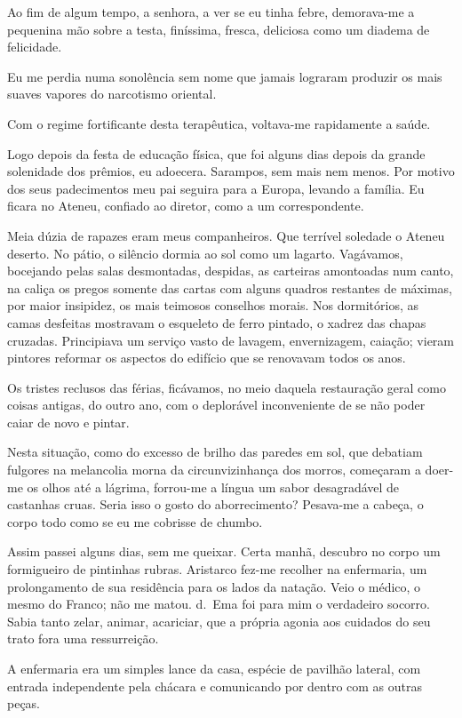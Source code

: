 Ao fim de algum tempo, a senhora, a ver se eu tinha febre, demorava{}-me
a pequenina mão sobre a testa, finíssima, fresca, deliciosa como um
diadema de felicidade. 

Eu me perdia numa sonolência sem nome que jamais
lograram produzir os mais suaves vapores do narcotismo oriental. 

Com o regime fortificante desta terapêutica, voltava{}-me rapidamente a
saúde. 

Logo depois da festa de educação física, que foi alguns dias
depois da grande solenidade dos prêmios, eu adoecera. Sarampos, sem
mais nem menos. Por motivo dos seus padecimentos meu pai seguira para a
Europa, levando a família. Eu ficara no Ateneu, confiado ao diretor,
como a um correspondente. 

Meia dúzia de rapazes eram meus companheiros.
Que terrível soledade o Ateneu deserto. No pátio, o silêncio dormia ao
sol como um lagarto. Vagávamos, bocejando pelas salas desmontadas,
despidas, as carteiras amontoadas num canto, na caliça os pregos
somente das cartas com alguns quadros restantes de máximas, por maior
insipidez, os mais teimosos conselhos morais. Nos dormitórios, as camas
desfeitas mostravam o esqueleto de ferro pintado, o xadrez das chapas
cruzadas. Principiava um serviço vasto de lavagem, envernizagem,
caiação; vieram pintores reformar os aspectos do edifício que se
renovavam todos os anos. 

Os tristes reclusos das férias, ficávamos, no
meio daquela restauração geral como coisas antigas, do outro ano, com o
deplorável inconveniente de se não poder caiar de novo e pintar. 

Nesta situação, como do excesso de brilho das paredes em sol, que debatiam
fulgores na melancolia morna da circunvizinhança dos morros, começaram
a doer{}-me os olhos até a lágrima, forrou{}-me a língua um sabor
desagradável de castanhas cruas. Seria isso o gosto do aborrecimento?
Pesava{}-me a cabeça, o corpo todo como se eu me cobrisse de chumbo.

Assim passei alguns dias, sem me queixar. Certa manhã, descubro no
corpo um formigueiro de pintinhas rubras. Aristarco fez{}-me recolher
na enfermaria, um prolongamento de sua residência para os lados da
natação. Veio o médico, o mesmo do Franco; não me matou. d.~Ema foi
para mim o verdadeiro socorro. Sabia tanto zelar, animar, acariciar,
que a própria agonia aos cuidados do seu trato fora uma ressurreição. 

A enfermaria era um simples lance da casa, espécie de pavilhão lateral,
com entrada independente pela chácara e comunicando por dentro com as
outras peças. 

